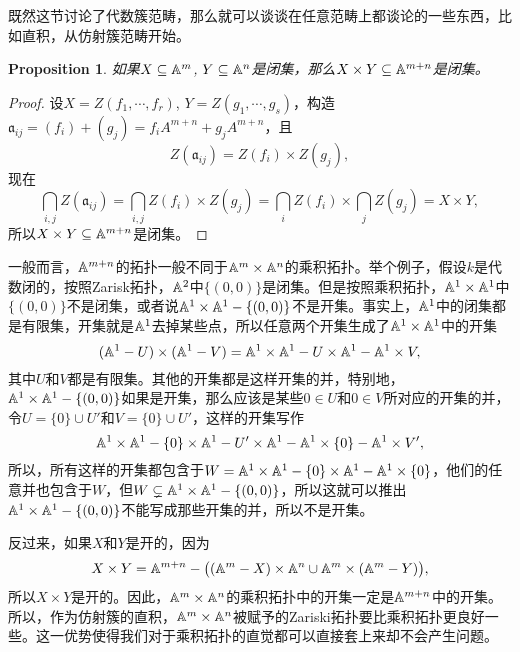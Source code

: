\documentclass[9pt]{extarticle}
\theoremstyle{plain}%
\newtheorem{pro}[defi]{Proposition}%
\begin{document}
既然这节讨论了代数簇范畴，那么就可以谈谈在任意范畴上都谈论的一些东西，比如直积，从仿射簇范畴开始。
\begin{pro}
	如果$X\subseteq \mathbb{A}^{m}$, $Y\subseteq \mathbb{A}^{n}$是闭集，那么$X\times Y\subseteq \mathbb{A}^{m+n}$是闭集。
\end{pro}
\begin{proof}
	设$X=Z(f_{1},\cdots,f_{r})$, $Y=Z(g_{1},\cdots,g_{s})$，构造$\mathfrak{a}_{ij}=(f_i)+(g_j)=f_iA^{m+n}+g_jA^{m+n}$，且
	\[
		Z(\mathfrak{a}_{ij})=Z(f_i)\times Z(g_j),
	\]
	现在
	\[
		\bigcap_{i,j}Z(\mathfrak{a}_{ij})=\bigcap_{i,j}Z(f_i)\times Z(g_j)=\bigcap_i Z(f_i)\times \bigcap_j Z(g_j)=X\times Y,
	\]
	所以$X\times Y\subseteq \mathbb{A}^{m+n}$是闭集。
\end{proof}

一般而言，$\mathbb{A}^{m+n}$的拓扑一般不同于$\mathbb{A}^{m}\times \mathbb{A}^n$的乘积拓扑。举个例子，假设$k$是代数闭的，按照Zarisk拓扑，$\mathbb{A}^{2}$中$\{(0,0)\}$是闭集。但是按照乘积拓扑，$\mathbb{A}^1\times \mathbb{A}^1$中$\{(0,0)\}$不是闭集，或者说$\mathbb{A}^1\times \mathbb{A}^1-\{(0,0)\}$不是开集。事实上，$\mathbb{A}^1$中的闭集都是有限集，开集就是$\mathbb{A}^1$去掉某些点，所以任意两个开集生成了$\mathbb{A}^1\times \mathbb{A}^1$中的开集
\[
	(\mathbb{A}^1-U)\times (\mathbb{A}^1-V)=\mathbb{A}^1\times\mathbb{A}^1-U\times\mathbb{A}^1-\mathbb{A}^1\times V,
\]
其中$U$和$V$都是有限集。其他的开集都是这样开集的并，特别地，$\mathbb{A}^1\times \mathbb{A}^1-\{(0,0)\}$如果是开集，那么应该是某些$0\in U$和$0\in V$所对应的开集的并，令$U=\{0\}\cup U'$和$V=\{0\}\cup U'$，这样的开集写作
\[
	\mathbb{A}^1\times\mathbb{A}^1-\{0\}\times\mathbb{A}^1-U'\times\mathbb{A}^1-\mathbb{A}^1\times \{0\}-\mathbb{A}^1\times V',
\]
所以，所有这样的开集都包含于$W=\mathbb{A}^1\times\mathbb{A}^1-\{0\}\times\mathbb{A}^1-\mathbb{A}^1\times \{0\}$，他们的任意并也包含于$W$，但$W\subsetneq\mathbb{A}^1\times\mathbb{A}^1-\{(0,0)\}$，所以这就可以推出$\mathbb{A}^1\times\mathbb{A}^1-\{(0,0)\}$不能写成那些开集的并，所以不是开集。

反过来，如果$X$和$Y$是开的，因为
\[
	X\times Y=\mathbb{A}^{m+n}-\bigl((\mathbb{A}^{m}-X)\times \mathbb{A}^n\cup\mathbb{A}^{m}\times (\mathbb{A}^{m}-Y)\bigr),
\]
所以$X\times Y$是开的。因此，$\mathbb{A}^{m}\times \mathbb{A}^n$的乘积拓扑中的开集一定是$\mathbb{A}^{m+n}$中的开集。所以，作为仿射簇的直积，$\mathbb{A}^{m}\times \mathbb{A}^n$被赋予的Zariski拓扑要比乘积拓扑更良好一些。这一优势使得我们对于乘积拓扑的直觉都可以直接套上来却不会产生问题。
\end{document}
